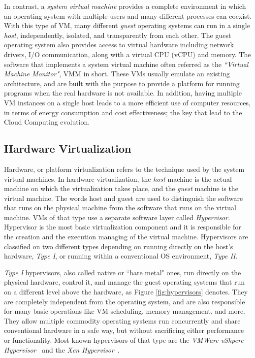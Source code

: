 In contrast, a \emph{system virtual machine} provides a complete environment in
which an operating system with multiple users and many different processes can
coexist. With this type of VM, many different \emph{guest} operating systems
can run in a single \emph{host}, independently, isolated, and transparently from
each other. The guest operating system also provides access to virtual hardware
including network drivers, I/O communication, along with a virtual CPU (vCPU)
and memory. The software that implements a system virtual machine often referred
as the \emph{``Virtual Machine Monitor"}, VMM in short. These VMs usually
emulate an existing architecture, and are built with the purpose to provide a
platform for running programs when the real hardware is not available. In
addition, having multiple VM instances on a single host leads to a more
efficient use of computer resources, in terms of energy consumption and cost
effectiveness; the key that lead to the Cloud Computing evolution.

\subsection{Hardware Virtualization}

Hardware, or platform virtualization refers to the technique used
by the system virtual machines. In hardware virtualization, the
\emph{host} machine is the actual machine on which the virtualization takes
place, and the \emph{guest} machine is the virtual machine. The words host and
guest are used to distinguish the software that runs on the physical machine
from the software that runs on the virtual machine. VMs of that type use a
separate software layer called \emph{Hypervisor}. Hypervisor is the most basic
virtualization component and it is responsible for the creation and the
execution managing of the virtual machine. Hypervisors are classified on two
different types depending on running directly on the host's hardware,
\emph{Type I}, or running within a conventional OS environment, \emph{Type II}.

\emph{Type I} hypervisors, also called native or ``bare metal" ones, run
directly on the physical hardware, control it, and manage the guest operating
systems that run on a different level above the hardware, as Figure
\ref{fig:hypervisors} denotes. They are completely independent from the
operating system, and are also responsible for many basic operations like VM
scheduling, memory management, and more. They allow
multiple commodity operating systems run concurrently and share conventional
hardware in a safe way, but without sacrificing either performance or
functionality. Most known hypervisors of that type are the \emph{VMWare vShpere
Hypervisor}~ and the
\emph{Xen Hypervisor}~\cite{xen_art}.

